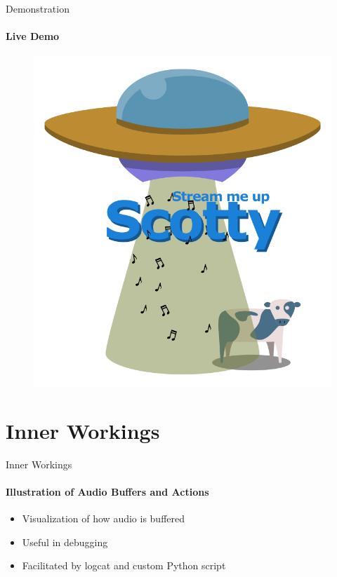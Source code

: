 \begin{frame}{Demonstration}
    \framesubtitle{Live Demo}
    \begin{figure}
    \centering
    \includegraphics[height=0.7\textheight]{images/scotty_white.png}
    \end{figure}
\end{frame}

\section{Inner Workings}

\begin{frame}{Inner Workings}
    \framesubtitle{Illustration of Audio Buffers and Actions}
    \begin{itemize}
        \item Visualization of how audio is buffered
        \item Useful in debugging
        \item Facilitated by logcat and custom Python script
    \end{itemize}
\end{frame}


